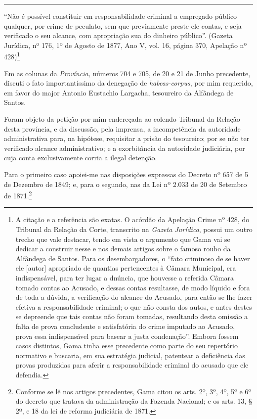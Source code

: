 \begin{center}\rule{0.5\linewidth}{\linethickness}\end{center}

``Não é possível constituir em responsabilidade criminal a empregado
público qualquer, por crime de peculato, sem que previamente preste ele
contas, e seja verificado o seu alcance, com apropriação sua do dinheiro
público''. (Gazeta Jurídica, nº 176, 1º de Agosto de 1877, Ano V, vol.
16, página 370, Apelação nº 428)\footnote{A citação e a referência são
  exatas. O acórdão da Apelação Crime nº 428, do Tribunal da Relação da
  Corte, transcrito na \emph{Gazeta Jurídica}, possui um outro trecho
  que vale destacar, tendo em vista o argumento que Gama vai se dedicar
  a construir nesse e nos demais artigos sobre o famoso roubo da
  Alfândega de Santos. Para os desembargadores, o ``fato criminoso de se
  haver ele {[}autor{]} apropriado de quantias pertencentes à Câmara
  Municipal, era indispensável, para ter lugar a dnúncia, que houvesse a
  referida Câmara tomado contas ao Acusado, e dessas contas resultasse,
  de modo líquido e fora de toda a dúvida, a verificação do alcance do
  Acusado, para então se lhe fazer efetiva a responsabilidade criminal;
  o que não consta dos autos, e antes destes se depreende que tais
  contas não foram tomadas, resultando desta omissão a falta de prova
  concludente e satisfatória do crime imputado ao Acusado, prova essa
  indispensável para basear a justa condenação''. Embora fossem casos
  distintos, Gama tinha esse precedente como parte do seu repertório
  normativo e buscaria, em sua estratégia judicial, patentear a
  deficiência das provas produzidas para aferir a responsabilidade
  criminal do acusado que ele defendia.}

Em as colunas da \emph{Província,} números 704 e 705, de 20 e 21 de
Junho precedente, discuti o fato importantíssimo da denegação de
\emph{habeas-corpus}, por mim requerido, em favor do major Antonio
Eustachio Largacha, tesoureiro da Alfândega de Santos.

Foram objeto da petição por mim endereçada ao colendo Tribunal da
Relação desta província, e da discussão, pela imprensa, a incompetência
da autoridade administrativa para, na hipótese, requisitar a prisão do
tesoureiro; por se não ter verificado alcance administrativo; e a
exorbitância da autoridade judiciária, por cuja conta exclusivamente
corria a ilegal detenção.

Para o primeiro caso apoiei-me nas disposições expressas do Decreto nº
657 de 5 de Dezembro de 1849; e, para o segundo, nas da Lei nº 2.033 de
20 de Setembro de 1871.\footnote{Conforme se lê nos artigos precedentes,
  Gama citou os arts. 2º, 3º, 4º, 5º e 6º do decreto que tratava da
  administração da Fazenda Nacional; e os arts. 13, § 2º, e 18 da lei de
  reforma judiciária de 1871.}

